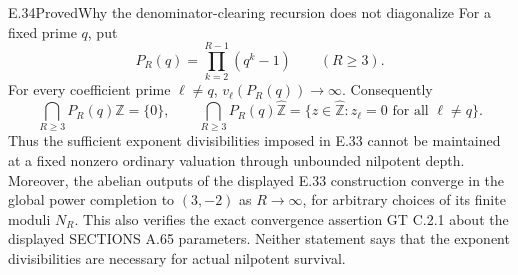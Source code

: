 \begin{result}{E.34}{Proved}{Why the denominator-clearing recursion does not diagonalize}
\label{coh:diagonal-barrier}
For a fixed prime $q$, put
\[
 P_R(q)=\prod_{k=2}^{R-1}(q^k-1)\qquad(R\ge3).
\]
For every coefficient prime $\ell\ne q$,
$v_\ell(P_R(q))\to\infty$.  Consequently
\[
 \bigcap_{R\ge3}P_R(q)\mathbb Z=\{0\},\qquad
 \bigcap_{R\ge3}P_R(q)\widehat{\mathbb Z}
 =\{z\in\widehat{\mathbb Z}:z_\ell=0\text{ for all }\ell\ne q\}.
 \tag{E.34.1}
\]
Thus the sufficient exponent divisibilities imposed in E.33 cannot be
maintained at a fixed nonzero ordinary valuation through unbounded
nilpotent depth. Moreover, the abelian outputs of the displayed
E.33 construction converge in the global power completion to
$(3,-2)$ as $R\to\infty$, for arbitrary choices of its finite
moduli $N_R$. This also verifies the exact convergence assertion
GT C.2.1 about the displayed SECTIONS A.65 parameters.
Neither statement says that the exponent divisibilities are necessary
for actual nilpotent survival.
\end{result}
